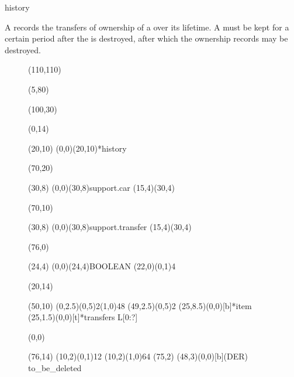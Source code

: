 \documentclass{article}
\begin{document}
 \begin{Mnamedesc}{history}

 \begin{Mdesctext}

 A  records the transfers of ownership of a  over its
 lifetime. A  must be kept for a certain period after the
  is destroyed, after which the ownership records may be destroyed.

 \end{Mdesctext}


%
 \begin{figure}[tbp]
 \center
 \setlength{\unitlength}{1mm}
 \begin{picture}(110,110)
 \thicklines

 \put(5,80){\begin{picture}(100,30)

   \put(0,14){\begin{picture}(20,10)
     \put(0,0){\framebox(20,10){*history}}
     \end{picture}}

   \put(70,20){\begin{picture}(30,8)
     \put(0,0){(30,8){support.car}}
     \put(15,4){\oval(30,4)}
     \end{picture}}

   \put(70,10){\begin{picture}(30,8)
     \put(0,0){(30,8){support.transfer}}
     \put(15,4){\oval(30,4)}
     \end{picture}}

   \put(76,0){\begin{picture}(24,4)
     \put(0,0){\framebox(24,4){BOOLEAN}}
     \put(22,0){\line(0,1){4}}
     \end{picture}}

   \put(20,14){\begin{picture}(50,10)
     \multiput(0,2.5)(0,5){2}{\line(1,0){48}}
     \multiput(49,2.5)(0,5){2}{}
     \put(25,8.5){\makebox(0,0)[b]{*item}}
     \put(25,1.5){\makebox(0,0)[t]{*transfers L[0:?]}}
     \end{picture}}

   \put(0,0){\begin{picture}(76,14)
     \put(10,2){\line(0,1){12}}
     \put(10,2){\line(1,0){64}}
     \put(75,2){}
     \put(48,3){\makebox(0,0)[b]{(DER) to\_be\_deleted}}
     \end{picture}}


\end{picture}}
\end{picture}
\end{figure}
\end{Mnamedesc}
\end{document}
